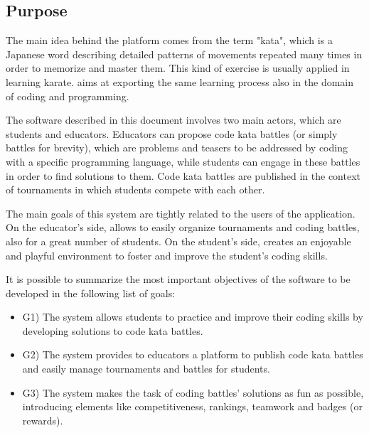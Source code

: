 \subsection{Purpose}
The main idea behind the \app platform comes from the term "kata", which is a Japanese word describing detailed patterns of movements repeated many times in order to memorize and master them. This kind of exercise is usually applied in learning karate. \app aims at exporting the same learning process also in the domain of coding and programming. 
 
The software described in this document involves two main actors, which are students and educators.  Educators can propose code kata battles (or simply battles for brevity), which are problems and teasers to be addressed by coding with a specific programming language,  while students can engage in these battles in order to find solutions to them. Code kata battles are published in the context of tournaments in which students compete with each other.
 
The main goals of this system are tightly related to the users of the application. On the educator's side, \app allows to easily organize tournaments and coding battles, also for a great number of students. On the student's side, \app creates an enjoyable and playful environment to foster and improve the student's coding skills.
 
It is possible to summarize the most important objectives of the software to be developed in the following list of goals:
\begin{itemize}
	\item G1) The system allows students to practice and improve their coding skills by developing solutions to code kata battles.
	\item G2) The system provides to educators a platform to publish code kata battles and easily manage tournaments and battles for students.
	\item G3) The system makes the task of coding battles' solutions as fun as possible, introducing elements like competitiveness, rankings, teamwork and badges (or rewards).
\end{itemize}

\newpage